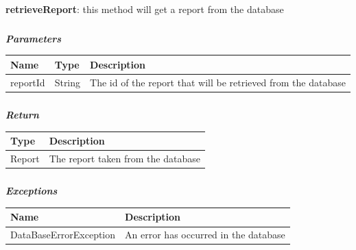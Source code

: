 						\paragraph{}
							\textbf{retrieveReport}: this method will get a report from the database
							\subparagraph{}
							\textit{\textbf{Parameters}}
								\begin{table}[!h]
									\begin{tabular}{L{0.2\textwidth}L{0.2\textwidth}L{0.2\textwidth}}
										\toprule
										Name & Type & Description \\
										\midrule
								  		reportId & String & The id of the report that will be retrieved from the database \\
								 		\bottomrule
									\end{tabular}
								\end{table}
							\subparagraph{}
								\textit{\textbf{Return}}
									\begin{table}[!h]
									\begin{tabular}{L{0.3\textwidth}L{0.3\textwidth}}
										\toprule
										Type & Description \\
										\midrule
								  	Report & The report taken from the database \\
								 		\bottomrule
									\end{tabular}
								\end{table}
							\subparagraph{}
								\textit{\textbf{Exceptions}}
									\begin{table}[!h]
									\begin{tabular}{L{0.3\textwidth}L{0.3\textwidth}}
										\toprule
										Name & Description \\
										\midrule
								  		DataBaseErrorException & An error has occurred in the database \\ 
								 		\bottomrule
									\end{tabular}
								\end{table}
						
